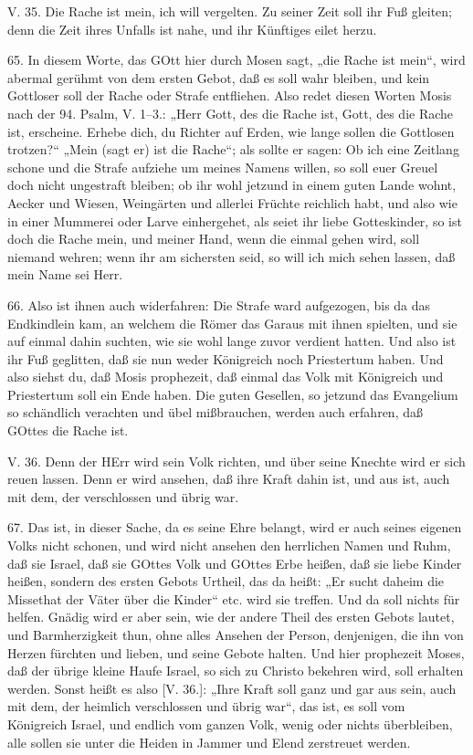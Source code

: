 \begin{schriftzitat}
V. 35. Die Rache ist mein, ich will vergelten. Zu seiner Zeit soll ihr Fuß gleiten; denn die Zeit ihres Unfalls ist nahe, und ihr Künftiges eilet herzu.
\end{schriftzitat}

65. In diesem Worte, das GOtt hier durch Mosen sagt, „die Rache ist mein“, wird abermal gerühmt von dem ersten Gebot, daß es soll wahr bleiben, und kein Gottloser soll der Rache oder Strafe entfliehen. Also redet diesen Worten Mosis nach der 94. Psalm, V. 1–3.: „Herr Gott, des die Rache ist, Gott, des die Rache ist, erscheine. Erhebe dich, du Richter auf Erden, wie lange sollen die Gottlosen trotzen?“ „Mein (sagt er) ist die Rache“; als sollte er sagen: Ob ich eine Zeitlang schone und die Strafe aufziehe um meines Namens willen, so soll euer Greuel doch nicht ungestraft bleiben; ob ihr wohl jetzund in einem guten Lande wohnt, Aecker und Wiesen, Weingärten und allerlei Früchte reichlich habt, und also wie in einer Mummerei oder Larve einhergehet, als seiet ihr liebe Gotteskinder, so ist doch die Rache mein, und meiner Hand, wenn die einmal gehen wird, soll niemand wehren; wenn ihr am sichersten seid, so will ich mich sehen lassen, daß mein Name sei Herr.

66. Also ist ihnen auch widerfahren: Die Strafe ward aufgezogen, bis da das Endkindlein kam, an welchem die Römer das Garaus mit ihnen spielten, und sie auf einmal dahin suchten, wie sie wohl lange zuvor verdient hatten. Und also ist ihr Fuß geglitten, daß sie nun weder
Königreich noch Priestertum haben. Und also siehst du, daß Mosis prophezeit, daß einmal das Volk mit Königreich und Priestertum soll ein Ende haben. Die guten Gesellen, so jetzund das Evangelium so schändlich verachten und übel mißbrauchen, werden auch erfahren, daß GOttes die Rache ist.

\begin{schriftzitat}
V. 36. Denn der HErr wird sein Volk richten, und über seine Knechte wird er sich reuen lassen. Denn er wird ansehen, daß ihre Kraft dahin ist, und aus ist, auch mit dem, der verschlossen und übrig war.
\end{schriftzitat}

67. Das ist, in dieser Sache, da es seine Ehre belangt, wird er auch seines eigenen Volks nicht schonen, und wird nicht ansehen den herrlichen Namen und Ruhm, daß sie Israel, daß sie GOttes Volk und GOttes Erbe heißen, daß sie liebe Kinder heißen, sondern des ersten Gebots Urtheil, das da heißt: „Er sucht daheim die Missethat der Väter über die Kinder“ etc. wird sie treffen. Und da soll nichts für helfen. Gnädig wird er aber sein, wie der andere Theil des ersten Gebots lautet, und Barmherzigkeit thun, ohne alles Ansehen der Person, denjenigen, die ihn von Herzen fürchten und lieben, und seine Gebote halten. Und hier prophezeit Moses, daß der übrige kleine Haufe Israel, so sich zu Christo bekehren wird, soll erhalten werden. Sonst heißt es also [V. 36.]: „Ihre Kraft soll ganz und gar aus sein, auch mit dem, der heimlich verschlossen und übrig war“, das ist, es soll vom Königreich Israel, und endlich vom ganzen Volk, wenig oder nichts überbleiben, alle sollen sie unter die Heiden in Jammer und Elend zerstreuet werden.

